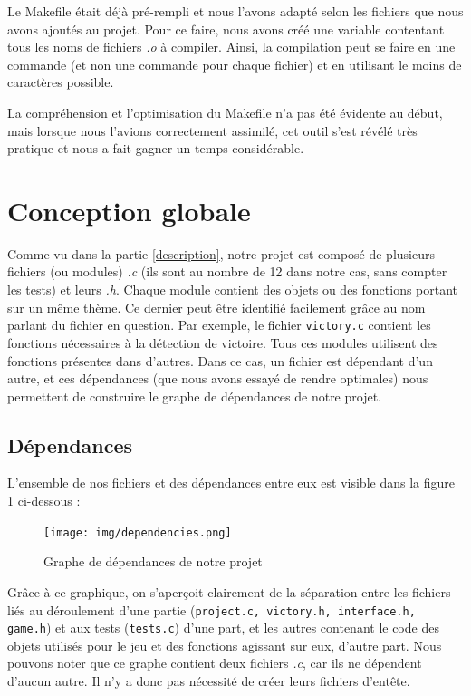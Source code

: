 \documentclass[a4paper]{article}
\begin{document}
Le Makefile était déjà pré-rempli et nous l'avons adapté selon les fichiers que nous avons ajoutés au projet. Pour ce faire, nous avons créé une variable contentant tous les noms de fichiers \emph{.o} à compiler. Ainsi, la compilation peut se faire en une commande (et non une commande pour chaque fichier) et en utilisant le moins de caractères possible.

La compréhension et l'optimisation du Makefile n'a pas été évidente au début, mais lorsque nous l'avions correctement assimilé, cet outil s'est révélé très pratique et nous a fait gagner un temps considérable.

\section{Conception globale}
\label{conception}

Comme vu dans la partie \ref{description}, notre projet est composé de plusieurs fichiers (ou modules) \emph{.c} (ils sont au nombre de 12 dans notre cas, sans compter les tests) et leurs \emph{.h}. Chaque module contient des objets ou des fonctions portant sur un même thème. Ce dernier peut être identifié facilement grâce au nom parlant du fichier en question. Par exemple, le fichier \verb|victory.c| contient les fonctions nécessaires à la détection de victoire. Tous ces modules utilisent des fonctions présentes dans d'autres. Dans ce cas, un fichier est dépendant d'un autre, et ces dépendances (que nous avons essayé de rendre optimales) nous permettent de construire le graphe de dépendances de notre projet.

\subsection{Dépendances}
\label{dep}

L'ensemble de nos fichiers et des dépendances entre eux est visible dans la figure \ref{fig:dep} ci-dessous :

\begin{center}
\begin{figure}[H]
    \centering
    \texttt{[image: img/dependencies.png]}~\\[0.5 cm]
    \caption{Graphe de dépendances de notre projet}
    \label{fig:dep}
\end{figure}
\end{center}

Grâce à ce graphique, on s'aperçoit clairement de la séparation entre les fichiers liés au déroulement d'une partie (\verb|project.c, victory.h, interface.h, game.h|) et aux tests (\verb|tests.c|) d'une part, et les autres contenant le code des objets utilisés pour le jeu et des fonctions agissant sur eux, d'autre part. Nous pouvons noter que ce graphe contient deux fichiers \emph{.c}, car ils ne dépendent d'aucun autre. Il n'y a donc pas nécessité de créer leurs fichiers d'entête.
\end{document}
